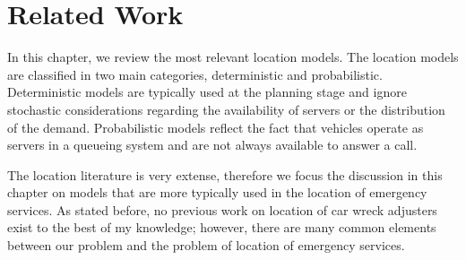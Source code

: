 \chapter{Related Work}
\label{ch:RelatedWork}
In this chapter,
we review
the most relevant
location models.
The location models
are classified in two main categories,
deterministic and probabilistic.
Deterministic models
are typically used at the planning stage
and ignore stochastic considerations
regarding the availability of servers
or the distribution of the demand.
Probabilistic models
reflect the fact that
vehicles operate as servers in a queueing system
and are not always available
to answer a call.

The location literature is very extense,
therefore
we focus the discussion in this chapter
on models
that are more typically used
in the location of emergency services.
As stated before,
no previous work
on location of car wreck adjusters exist
to the best of my knowledge;
however,
there are many common elements
between our problem
and the problem of location of emergency services.





